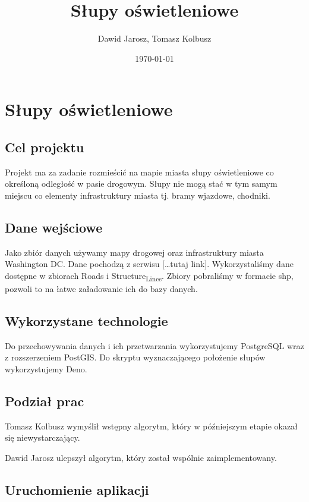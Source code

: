 \documentclass[11pt]{article}
\author{Dawid Jarosz, Tomasz Kolbusz}
\date{\today}
\title{Słupy oświetleniowe}
\begin{document}
\maketitle
\tableofcontents


\section{Słupy oświetleniowe}
\label{sec:org0fc4196}

\subsection{Cel projektu}
\label{sec:org96f53b2}
Projekt ma za zadanie rozmieścić na mapie miasta słupy oświetleniowe co określoną odległość w pasie drogowym. Słupy nie mogą stać w tym samym miejscu co elementy infrastruktury miasta tj. bramy wjazdowe, chodniki.

\subsection{Dane wejściowe}
\label{sec:org076853f}

Jako zbiór danych używamy mapy drogowej oraz infrastruktury miasta Washington DC. Dane pochodzą z serwisu [\ldots{}tutaj link]. Wykorzystaliśmy dane dostępne w zbiorach Roads i Structure\textsubscript{Lines}. Zbiory pobraliśmy w formacie shp, pozwoli to na łatwe załadowanie ich do bazy danych.

\subsection{Wykorzystane technologie}
\label{sec:orge1bc8dc}

Do przechowywania danych i ich przetwarzania wykorzystujemy PostgreSQL wraz z rozszerzeniem PostGIS. Do skryptu wyznaczającego położenie słupów wykorzystujemy Deno.

\subsection{Podział prac}
\label{sec:orgd23b649}

Tomasz Kolbusz wymyślił wstępny algorytm, który w późniejszym etapie okazał się niewystarczający.

Dawid Jarosz ulepszył algorytm, który został wspólnie zaimplementowany.

\subsection{Uruchomienie aplikacji}
\label{sec:org00b981a}
\end{document}
